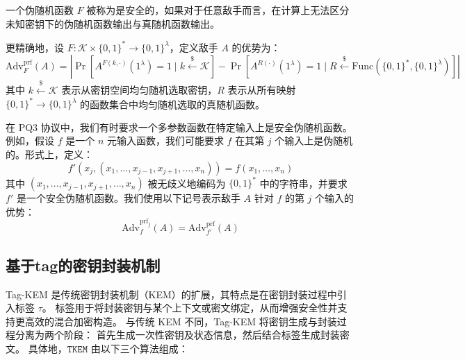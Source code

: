 \begin{definition}[安全伪随机函数]
    一个伪随机函数 $F$ 被称为是安全的，如果对于任意敌手而言，在计算上无法区分未知密钥下的伪随机函数输出与真随机函数输出。
    
    更精确地，设 $F: \mathcal{K} \times \{0,1\}^* \to \{0,1\}^\lambda$，定义敌手 $A$ 的优势为：
    \[
    \text{Adv}^{\text{prf}}_F(A) = \left| \Pr\left[ A^{F(k,\cdot)}(1^\lambda) = 1 \mid k \xleftarrow{\$} \mathcal{K} \right] - \Pr\left[ A^{R(\cdot)}(1^\lambda) = 1 \mid R \xleftarrow{\$} \text{Func}(\{0,1\}^*, \{0,1\}^\lambda) \right] \right|
    \]
    其中 $k \xleftarrow{\$} \mathcal{K}$ 表示从密钥空间均匀随机选取密钥，$R$ 表示从所有映射 $\{0,1\}^* \to \{0,1\}^\lambda$ 的函数集合中均匀随机选取的真随机函数。

    在 PQ3 协议中，我们有时要求一个多参数函数在特定输入上是安全伪随机函数。例如，假设 $f$ 是一个 $n$ 元输入函数，我们可能要求 $f$ 在其第 $j$ 个输入上是伪随机的。形式上，定义：
    \[
    f'(x_j, (x_1, \ldots, x_{j-1}, x_{j+1}, \ldots, x_n)) = f(x_1, \ldots, x_n)
    \]
    其中 $(x_1, \ldots, x_{j-1}, x_{j+1}, \ldots, x_n)$ 被无歧义地编码为 $\{0,1\}^*$ 中的字符串，并要求 $f'$ 是一个安全伪随机函数。我们使用以下记号表示敌手 $A$ 针对 $f$ 的第 $j$ 个输入的优势：
    \[
    \text{Adv}^{\text{prf}_j}_f(A) = \text{Adv}^{\text{prf}}_{f'}(A)
    \]
\end{definition}

\newcommand{\tkem}{\texttt{TKEM}}
\newcommand{\Aigis}{\texttt{Aigis}}
\newcommand{\KEM}{\texttt{KEM}}
\newcommand{\from}{\gets}

\newcommand{\Encap}{\mathsf{Encap}}
\newcommand{\Decap}{\mathsf{Decap}}
\newcommand{\KeyGen}{\mathsf{KeyGen}}
\newcommand{\TagKEM}{\mathsf{Tag\text{-}KEM}}
\newcommand{\Adv}{\mathrm{Adv}}

\subsection{基于tag的密钥封装机制}
Tag-KEM 是传统密钥封装机制（KEM）的扩展，其特点是在密钥封装过程中引入标签 $\tau$。
标签用于将封装密钥与某个上下文或密文绑定，从而增强安全性并支持更高效的混合加密构造。
与传统 KEM 不同，Tag-KEM 将密钥生成与封装过程分离为两个阶段：
首先生成一次性密钥及状态信息，然后结合标签生成封装密文。
具体地，$\tkem$ 由以下三个算法组成：

